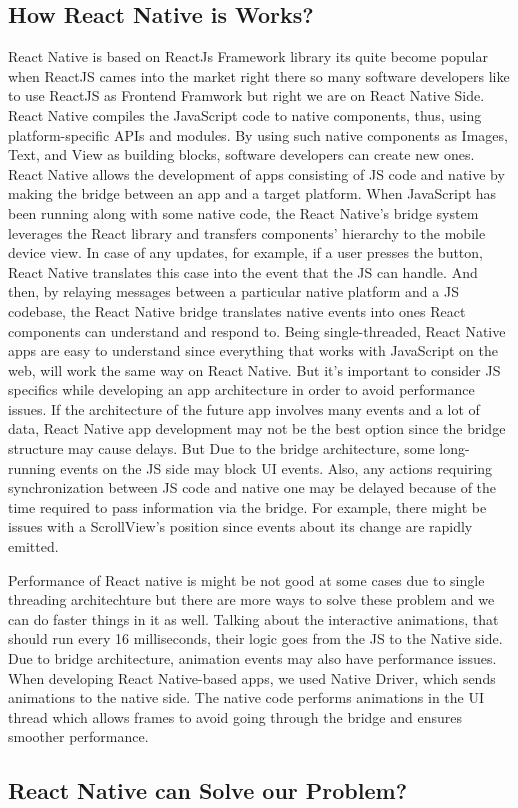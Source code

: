\documentclass[12pt,a4paper]{article}
\begin{document}
\subsection*{How React Native is Works?}
\qquad React Native is based on ReactJs Framework library its quite become popular when ReactJS cames into the market right there so many software developers like to use ReactJS as Frontend Framwork but right we are on React Native Side. React Native compiles the JavaScript code to native components, thus, using platform-specific APIs and modules. By using such native components as Images, Text, and View as building blocks, software developers can create new ones.
React Native allows the development of apps consisting of JS code and native by making the bridge between an app and a target platform. When JavaScript has been running along with some native code, the React Native’s bridge system leverages the React library and transfers components’ hierarchy to the mobile device view. In case of any updates, for example, if a user presses the button, React Native translates this case into the event that the JS can handle. And then, by relaying messages between a particular native platform and a JS codebase, the React Native bridge translates native events into ones React components can understand and respond to. Being single-threaded, React Native apps are easy to understand since everything that works with JavaScript on the web, will work the same way on React Native. But it’s important to consider JS specifics while developing an app architecture in order to avoid performance issues. If the architecture of the future app involves many events and a lot of data, React Native app development may not be the best option since the bridge structure may cause delays. But Due to the bridge architecture, some long-running events on the JS side may block UI events. Also, any actions requiring synchronization between JS code and native one may be delayed because of the time required to pass information via the bridge. For example, there might be issues with a ScrollView’s position since events about its change are rapidly emitted.
\par
Performance of React native is might be not good at some cases due to single threading architechture but there are more ways to solve these problem and we can do faster things in it as well. Talking about the interactive animations, that should run every 16 milliseconds, their logic goes from the JS to the Native side. Due to bridge architecture, animation events may also have performance issues. When developing React Native-based apps, we used Native Driver, which sends animations to the native side. The native code performs animations in the UI thread which allows frames to avoid going through the bridge and ensures smoother performance. 

\newpage

\subsection*{React Native can Solve our Problem?}
\end{document}
